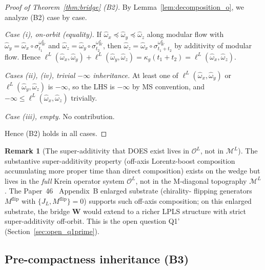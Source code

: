 \documentclass[11pt,a4paper]{article}
\theoremstyle{plain}
\theoremstyle{definition}
\newtheorem{remark}[theorem]{Remark}
\newcommand{\Op}{\mathcal{O}}
\newcommand{\Mcal}{\mathcal{M}}
\newcommand{\JL}{J_{L}}
\newcommand{\Wfun}{\mathbf{W}}
\newcommand{\BWvac}{\omega_{W}^{L}}
\newcommand{\kappag}{\kappa_{g}}
\begin{document}
\begin{proof}[Proof of Theorem~\ref{thm:bridge} (B2)]
By Lemma~\ref{lem:decomposition_o}, we analyze (B2) case by case.

\emph{Case (i), on-orbit (equality).} If $\hat{\omega}_{x} \preceq
\hat{\omega}_{y} \preceq \hat{\omega}_{z}$ along modular flow with
$\hat{\omega}_{y} = \hat{\omega}_{x}\circ\sigma_{t_{1}}^{\BWvac}$ and
$\hat{\omega}_{z} = \hat{\omega}_{y}\circ\sigma_{t_{2}}^{\BWvac}$,
then $\hat{\omega}_{z} = \hat{\omega}_{x}\circ\sigma_{t_{1} +
t_{2}}^{\BWvac}$ by additivity of modular flow. Hence
$\ell^{L}(\hat{\omega}_{x}, \hat{\omega}_{y}) + \ell^{L}(\hat{\omega}_{y},
\hat{\omega}_{z}) = \kappag(t_{1} + t_{2}) = \ell^{L}(\hat{\omega}_{x},
\hat{\omega}_{z})$.

\emph{Cases (ii), (iv), trivial $-\infty$ inheritance.} At least one
of $\ell^{L}(\hat{\omega}_{x}, \hat{\omega}_{y})$ or
$\ell^{L}(\hat{\omega}_{y}, \hat{\omega}_{z})$ is $-\infty$, so the
LHS is $-\infty$ by MS convention, and $-\infty \le
\ell^{L}(\hat{\omega}_{x}, \hat{\omega}_{z})$ trivially.

\emph{Case (iii), empty.} No contribution.

Hence (B2) holds in all cases.
\end{proof}

\begin{remark}[The super-additivity that DOES exist lives in
$\Op^{L}$, not in $\Mcal^{L}$]\label{rem:super_add_lives_elsewhere}
The substantive super-additivity property (off-axis Lorentz-boost
composition accumulating more proper time than direct composition)
exists on the wedge but lives in the \emph{full} Krein operator
system $\Op^{L}$, not in the M-diagonal topography $\Mcal^{L}$.
The Paper~46~\cite{paper46} Appendix~B enlarged substrate (chirality-
flipping generators $M^{\mathrm{flip}}$ with $\{\JL, M^{\mathrm{flip}}\}
= 0$) supports such off-axis composition; on this enlarged substrate,
the bridge $\Wfun$ would extend to a richer LPLS structure with strict
super-additivity off-orbit. This is the open question Q1'
(Section~\ref{sec:open_q1prime}).
\end{remark}

\subsection{Pre-compactness inheritance (B3)}\label{sec:b3_precompactness}
\end{document}
